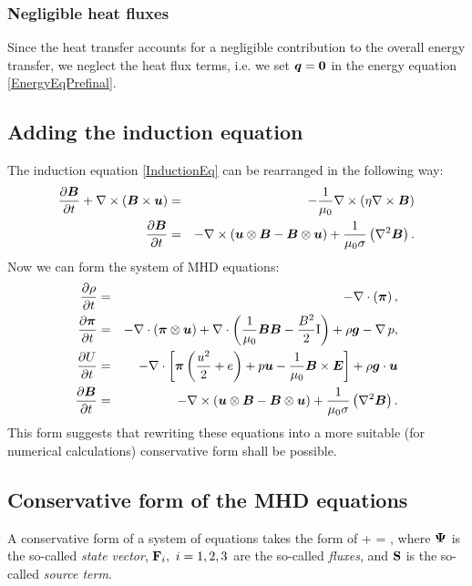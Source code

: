 \subsubsection{Negligible heat fluxes}
Since the heat transfer accounts for a negligible contribution to the overall energy transfer, we neglect the heat flux terms, i.e. we set $\mbox{\boldmath $q$} = \mathbf{0}$ in the energy equation \ref{EnergyEqPrefinal}.

\subsection{Adding the induction equation}
The induction equation \ref{InductionEq} can be rearranged in the following way:
\begin{eqnarray}
\frac{\partial{\mbox{\boldmath $B$}}}{\partial{t}} + \nabla \times \left( \mbox{\boldmath $B$} \times \mbox{\boldmath $u$} \right) & = & -\frac{1}{\mu_0} \nabla \times \left( \eta \nabla \times \mbox{\boldmath $B$} \right)\\
\label{InductionPreFinal} \frac{\partial{\mbox{\boldmath $B$}}}{\partial{t}} & = & - \nabla \times \left( \mbox{\boldmath $u$} \otimes \mbox{\boldmath $B$} - \mbox{\boldmath $B$} \otimes \mbox{\boldmath $u$} \right) + \frac{1}{\mu_{0}\sigma} \left( \nabla^2 \mbox{\boldmath $B$} \right).
\end{eqnarray}
Now we can form the system of MHD equations:
\begin{eqnarray}
\label{ContinuityEqFinal} \frac{\partial{\rho}}{\partial{t}} & = & - \nabla\cdot\left(\mbox{\boldmath $\pi$}\right),\\
\label{NSEqFinal} \frac{\partial{\mbox{\boldmath $\pi$}}}{\partial{t}} & = & - \nabla\cdot\left(\mbox{\boldmath $\pi$}\otimes\mbox{\boldmath $u$}\right) + \nabla\cdot\left(\frac{1}{\mu_0}\mbox{\boldmath $B$}\mbox{\boldmath $B$} - \frac{B^2}{2}\mathrm{I}\right) + \rho\mbox{\boldmath $g$} - \nabla\,p,\\
\label{EnergyEqFinal} \frac{\partial{U}}{\partial{t}} & = & -\nabla\cdot\left[\mbox{\boldmath $\pi$}\left( \frac{u^2}{2} + e\right) + p \mbox{\boldmath $u$} - \frac{1}{\mu_0}\mbox{\boldmath $B$}\times\mbox{\boldmath $E$}\right] + \rho \mbox{\boldmath $g$} \cdot \mbox{\boldmath $u$}\\
\label{InductionFinal} \frac{\partial{\mbox{\boldmath $B$}}}{\partial{t}} & = & - \nabla \times \left( \mbox{\boldmath $u$} \otimes \mbox{\boldmath $B$} - \mbox{\boldmath $B$} \otimes \mbox{\boldmath $u$} \right) + \frac{1}{\mu_{0}\sigma} \left( \nabla^2 \mbox{\boldmath $B$} \right).
\end{eqnarray}
This form suggests that rewriting these equations into a more suitable (for numerical calculations) conservative form shall be possible.
\subsection{Conservative form of the MHD equations}
A conservative form of a system of equations takes the form of
\be
\label{conservativeGeneric}  + \nabla \cdot \mrF\lo\mrPsi\ro = \mrS,
\ee
where $\mathrm{\mathbf{\Psi}}$ is the so-called \textit{state vector}, $\mathrm{\mathbf{F}}_i,\ i = 1, 2, 3$ are the so-called \textit{fluxes}, and $\mathrm{\mathbf{S}}$ is the so-called \textit{source term}.
